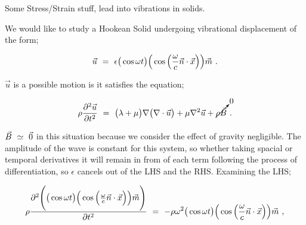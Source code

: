 \documentclass{article}
\newcounter{subsubsubsection}[subsubsection]
\begin{document}
Some Stress/Strain stuff, lead into vibrations in solids. 






We would like to study a Hookean Solid undergoing vibrational displacement of the form;

\begin{equation} \label{eq:1}
\vec{u} \hspace{0.125cm} = \hspace{0.125cm} \epsilon \big( \cos{ \omega t } \big) \Big( \cos \Big( \frac{\omega}{c} \vec{n} \cdot \vec{x} \Big) \Big) \vec{m} \hspace{0.125cm}  . 
\end{equation} 

\begin{math} \vec{u} \end{math} is a possible motion is it satisfies the equation;

\begin{equation} \label{eq:1}
\rho \frac{\partial{}^2 \vec{u}}{\partial{ t }^2} \hspace{0.125cm} = \hspace{0.125cm} \big( \lambda + \mu \big) \nabla \big( \nabla \cdot \vec{u} \big) + \mu \nabla{}^2 \vec{u} + \cancelto{0}{\rho \vec{B}} \hspace{0.125cm}  . 
\end{equation}

\begin{math} \vec{B} \hspace{0.125cm} \simeq \hspace{0.125cm} \vec{0} \end{math} in this situation because we consider the effect of gravity negligible. The amplitude of the wave is constant for this system, so whether taking spacial or temporal derivatives it will remain in from of each term following the process of differentiation, so \begin{math} \epsilon \end{math} cancels out of the LHS and the RHS. Examining the LHS; 

\begin{equation} \label{eq:1}
\rho \frac{\partial{}^2 \Bigg( \big( \cos{ \omega t } \big) \Big( \cos \Big( \frac{\omega}{c} \vec{n} \cdot \vec{x} \Big) \Big) \vec{m} \Bigg)}{\partial{ t }^2} \hspace{0.125cm} = \hspace{0.125cm} - \rho \omega{}^2 \big( \cos{ \omega t } \big) \Big( \cos \Big( \frac{\omega}{c} \vec{n} \cdot \vec{x} \Big) \Big) \vec{m} \hspace{0.125cm} ,
\end{equation}
\end{document}
